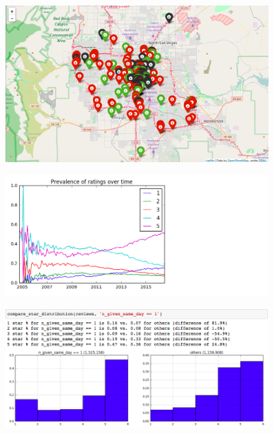\documentclass[11pt]{article}
\begin{document}
\begin{figure}[H]
\centering
\includegraphics[width=0.9\textwidth]{./ac209/mostreviewsbylocationlv.png}
\end{figure}


\begin{figure}[H]
\centering
\includegraphics[width=0.9\textwidth]{./ac209/prevalenceofratingsovertime.png}
\end{figure}

\begin{figure}[H]
\centering
\includegraphics[width=0.9\textwidth]{./ac209/numstarsreviewsperday.png}
\end{figure}
\end{document}
